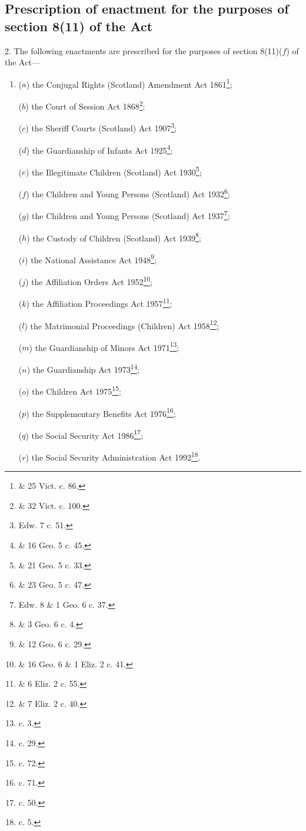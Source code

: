 \documentclass[12pt,a4paper]{article}
\begin{document}
\subsection[2. Prescription of enactment for the purposes of section 8(11) of the Act]{Prescription of enactment for the purposes of section 8(11) of the Act}


2.  The following enactments are prescribed for the purposes of section 8(11)($f$) of the Act—
\begin{enumerate}\item[]
($a$) the Conjugal Rights (Scotland) Amendment Act 1861\footnote{ \& 25 Vict. c. 86.};

($b$) the Court of Session Act 1868\footnote{ \& 32 Vict. c. 100.};

($c$) the Sheriff Courts (Scotland) Act 1907\footnote{ Edw. 7 c. 51.};

($d$) the Guardianship of Infants Act 1925\footnote{ \& 16 Geo. 5 c. 45.};

($e$) the Illegitimate Children (Scotland) Act 1930\footnote{ \& 21 Geo. 5 c. 33.};

($f$) the Children and Young Persons (Scotland) Act 1932\footnote{ \& 23 Geo. 5 c. 47.};

($g$) the Children and Young Persons (Scotland) Act 1937\footnote{ Edw. 8 \& 1 Geo. 6 c. 37.};

($h$) the Custody of Children (Scotland) Act 1939\footnote{ \& 3 Geo. 6 c. 4.};

($i$) the National Assistance Act 1948\footnote{ \& 12 Geo. 6 c. 29.};

($j$) the Affiliation Orders Act 1952\footnote{ \& 16 Geo. 6 \& 1 Eliz. 2 c. 41.};

($k$) the Affiliation Proceedings Act 1957\footnote{ \& 6 Eliz. 2 c. 55.};

($l$) the Matrimonial Proceedings (Children) Act 1958\footnote{ \& 7 Eliz. 2 c. 40.};

($m$) the Guardianship of Minors Act 1971\footnote{ c. 3.};

($n$) the Guardianship Act 1973\footnote{ c. 29.};

($o$) the Children Act 1975\footnote{ c. 72.};

($p$) the Supplementary Benefits Act 1976\footnote{ c. 71.};

\eject

($q$) the Social Security Act 1986\footnote{ c. 50.};

($r$) the Social Security Administration Act 1992\footnote{ c. 5.}.
\end{enumerate}
\end{document}
